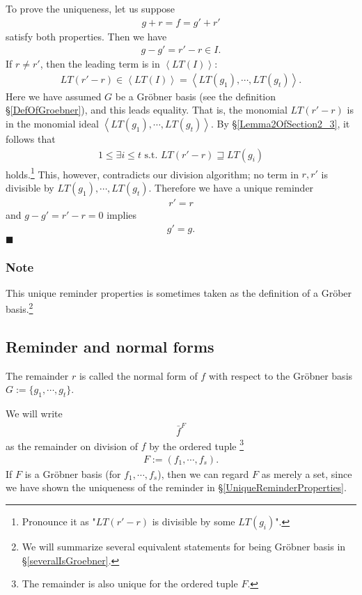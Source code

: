 \documentclass[11pt]{book}
\begin{document}
To prove the uniqueness, let us suppose
\begin{eqnarray}
g + r = f = g' + r'
\end{eqnarray}
satisfy both properties.
Then we have
\begin{eqnarray}
g - g' = r' - r \in I.
\end{eqnarray}
If $r \neq r'$, then the leading term is in $\left< LT(I) \right>$:
\begin{eqnarray}
LT(r' - r) \in \left< LT(I) \right> = \left< LT(g_1), \cdots, LT(g_t) \right>.
\end{eqnarray}
Here we have assumed $G$ be a Gr\"obner basis (see the definition \S\ref{DefOfGroebner}), and this leads equality.
That is, the monomial $LT(r' - r)$ is in the monomial ideal $\left< LT(g_1), \cdots, LT(g_t) \right>$.
By \S\ref{Lemma2OfSection2_3}, it follows that
\begin{eqnarray}
1 \leq \exists i \leq t \text{ s.t. } LT(r' - r ) \sqsupseteq LT(g_i)
\end{eqnarray}
holds.\footnote{Pronounce it as "$LT(r' - r )$ is divisible by some $LT(g_i)$".}
This, however, contradicts our division algorithm; no term in $r, r'$ is divisible by $LT(g_1), \cdots, LT(g_t)$.
Therefore we have a unique reminder
\begin{eqnarray}
r' = r
\end{eqnarray}
and $g - g' = r' - r = 0$ implies
\begin{eqnarray}
g' = g.
\end{eqnarray}
$\blacksquare$

\subsubsection{Note}
This unique reminder properties is sometimes taken as the definition of a Gr\"ober basis.\footnote{We will summarize several equivalent statements for being Gr\"obner basis in \S\ref{severalIsGroebner}.}

\subsection{Reminder and normal forms}
\label{normalForms}
The remainder $r$ is called the normal form of $f$ with respect to the Gr\"obner basis $G := \{g_1, \cdots, g_t\} $.

We will write
\begin{eqnarray}
\bar{f}^F
\end{eqnarray}
as the remainder on division of $f$ by the ordered tuple \footnote{The remainder is also unique for the ordered tuple $F$.}
\begin{eqnarray}
F := (f_1, \cdots, f_s).
\end{eqnarray}
If $F$ is a Gr\"obner basis (for $f_1, \cdots, f_s$), then we can regard $F$ as merely a set, since we have shown the uniqueness of the reminder in \S\ref{UniqueReminderProperties}.
\end{document}
